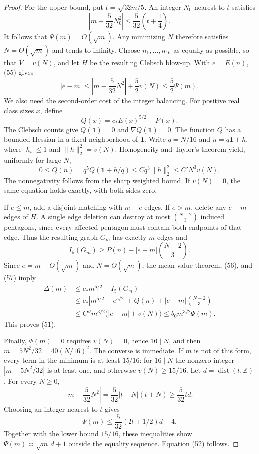 \documentclass[11pt]{amsart}
\theoremstyle{definition}
\theoremstyle{remark}
\begin{document}
\begin{proof}
For the upper bound, put $t=\sqrt{32m/5}$. An integer $N_0$ nearest to $t$
satisfies
\[
 \left|m-\frac5{32}N_0^2\right|
 \leq\frac5{32}\left(t+\frac14\right).
\]
It follows that $\Psi(m)=O(\sqrt m)$. Any minimizing $N$ therefore
satisfies $N=\Theta(\sqrt m)$ and tends to infinity. Choose
$n_1,\ldots,n_{16}$ as equally as possible, so that $V=v(N)$, and let $H$
be the resulting Clebsch blow-up. With $e=E(n)$, (55) gives
\begin{equation}\tag{56}\label{eq:56}
 |e-m|\leq\left|m-\frac5{32}N^2\right|+\frac52v(N)
 \leq\frac52\Psi(m).
\end{equation}
We also need the second-order cost of the integer balancing. For positive
real class sizes $x$, define
\[
 Q(x)=c_\ast E(x)^{5/2}-P(x).
\]
The Clebsch counts give $Q(\mathbf1)=0$ and $\nabla Q(\mathbf1)=0$. The
function $Q$ has a bounded Hessian in a fixed neighborhood of $\mathbf1$.
Write $q=N/16$ and $n=q\mathbf1+h$, where $|h_i|\leq1$ and
$\|h\|_2^2=v(N)$. Homogeneity and Taylor's theorem yield, uniformly for
large $N$,
\begin{equation}\tag{57}\label{eq:57}
 0\leq Q(n)=q^5Q(\mathbf1+h/q)
 \leq Cq^3\|h\|_2^2\leq C'N^3v(N).
\end{equation}
The nonnegativity follows from the sharp weighted bound. If $v(N)=0$, the
same equation holds exactly, with both sides zero.

If $e\leq m$, add a disjoint matching with $m-e$ edges. If $e>m$, delete
any $e-m$ edges of $H$. A single edge deletion can destroy at most
$\binom{N-2}3$ induced pentagons, since every affected pentagon must contain
both endpoints of that edge. Thus the resulting graph $G_m$ has exactly
$m$ edges and
\[
 I_5(G_m)\geq P(n)-|e-m|\binom{N-2}3.
\]
Since $e=m+O(\sqrt m)$ and $N=\Theta(\sqrt m)$, the mean value theorem,
(56), and (57) imply
\[
 \begin{split}
 \Delta(m)&\leq c_\ast m^{5/2}-I_5(G_m)\\
 &\leq c_\ast|m^{5/2}-e^{5/2}|+Q(n)+|e-m|\binom{N-2}3\\
 &\leq C''m^{3/2}\bigl(|e-m|+v(N)\bigr)
 \leq b_0m^{3/2}\Psi(m).
 \end{split}
\]
This proves (51).

Finally, $\Psi(m)=0$ requires $v(N)=0$, hence $16\mid N$, and then
$m=5N^2/32=40(N/16)^2$. The converse is immediate. If $m$ is not of this
form, every term in the minimum is at least $15/16$: for $16\mid N$ the
nonzero integer $|m-5N^2/32|$ is at least one, and otherwise
$v(N)\geq15/16$. Let $d=\operatorname{dist}(t,\mathbb Z)$. For every
$N\geq0$,
\[
 \left|m-\frac5{32}N^2\right|=\frac5{32}|t-N|(t+N)
 \geq\frac5{32}td.
\]
Choosing an integer nearest to $t$ gives
\[
 \Psi(m)\leq\frac5{32}(2t+1/2)d+4.
\]
Together with the lower bound $15/16$, these inequalities show
$\Psi(m)\asymp\sqrt m\,d+1$ outside the equality sequence. Equation (52)
follows.
\end{proof}
\end{document}
